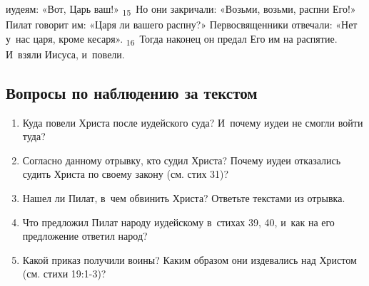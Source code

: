 \documentclass[a4paper,12pt]{article}
\begin{document}
иудеям: «Вот, Царь ваш!» \textsubscript{15}~Но они закричали: «Возьми, возьми, распни Его!» Пилат говорит им: «Царя ли вашего распну?» Первосвященники отвечали: «Нет у~нас царя, кроме кесаря». \textsubscript{16}~Тогда наконец он предал Его им на распятие. И~взяли Иисуса, и~повели. 
\subsection*{Вопросы по наблюдению за текстом}
\begin{enumerate}
    \item Куда повели Христа после иудейского суда? И~почему иудеи не смогли войти туда? 
    
    \myline
    
    \myline
    \item Согласно данному отрывку, кто судил Христа? Почему иудеи отказались судить Христа по своему закону (см. стих 31)? 
    
    \myline
    
    \myline
    \item Нашел ли Пилат, в~чем обвинить Христа? Ответьте текстами из отрывка. 
    
    \myline
    
    \myline
    \item Что предложил Пилат народу иудейскому в~стихах 39, 40, и~как на его предложение ответил народ? 
    
    \myline
    
    \myline
    \item Какой приказ получили воины? Каким образом они издевались над Христом (см. стихи 19:1-3)? 
    
    \myline
    
    \myline
\end{enumerate}
\end{document}
